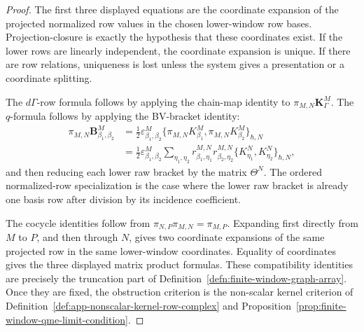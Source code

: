 \begin{proof}
  The first three displayed equations are the coordinate expansion of
  the projected normalized row values in the chosen lower-window row bases.
  Projection-closure is exactly the hypothesis that these coordinates
  exist.  If the lower rows are linearly independent, the coordinate
  expansion is unique.  If there are row relations, uniqueness is lost unless
  the system gives a presentation or a coordinate splitting.

  The \(d\Gamma\)-row formula follows by applying the chain-map identity to
  \(\pi_{M,N}\mathbf K^M_\Gamma\).  The \(q\)-formula follows by applying the
  BV-bracket identity:
  \[
  \begin{aligned}
    \pi_{M,N}\mathbf B^M_{\beta_1,\beta_2}
      &=
      \frac12\varepsilon^M_{\beta_1,\beta_2}
      \{\pi_{M,N}K^M_{\beta_1},
        \pi_{M,N}K^M_{\beta_2}\}_{\hbar,N}  \\
      &=
      \frac12\varepsilon^M_{\beta_1,\beta_2}
      \sum_{\eta_1,\eta_2}
      r^{M,N}_{\beta_1,\eta_1}
      r^{M,N}_{\beta_2,\eta_2}
      \{K^N_{\eta_1},K^N_{\eta_2}\}_{\hbar,N},
  \end{aligned}
  \]
  and then reducing each lower raw bracket by the matrix \(\Theta^N\).
  The ordered normalized-row specialization is the case where the lower
  raw bracket is already one basis row after division by its incidence
  coefficient.

  The cocycle identities follow from
  \(\pi_{N,P}\pi_{M,N}=\pi_{M,P}\).  Expanding first directly from \(M\) to
  \(P\), and then through \(N\), gives two coordinate expansions of the same
  projected row in the same lower-window coordinates.  Equality of
  coordinates gives the three displayed matrix product formulas.  These
  compatibility identities are precisely the truncation part of
  Definition~\ref{defn:finite-window-graph-array}.  Once they are fixed,
  the obstruction criterion is the non-scalar kernel criterion of
  Definition~\ref{def:app-nonscalar-kernel-row-complex} and
  Proposition~\ref{prop:finite-window-qme-limit-condition}.
\end{proof}

